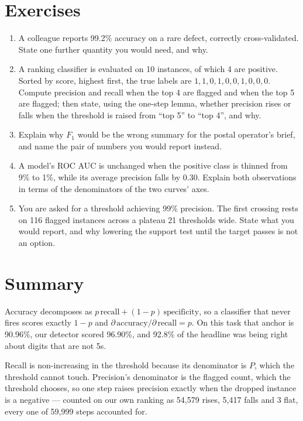 \documentclass[11pt,a4paper]{article}
\begin{document}
\section{Exercises}

\begin{enumerate}[leftmargin=1.6em,itemsep=4pt]
  \item A colleague reports 99.2\% accuracy on a rare defect, correctly
        cross-validated. State one further quantity you would need, and why.
        \hfill \scope{[4]}
  \item A ranking classifier is evaluated on 10 instances, of which 4 are
        positive. Sorted by score, highest first, the true labels are
        $1,1,0,1,0,0,1,0,0,0$. Compute precision and recall when the top 4 are
        flagged and when the top 5 are flagged; then state, using the one-step
        lemma, whether precision rises or falls when the threshold is raised
        from ``top 5'' to ``top 4'', and why. \hfill \scope{[3]}
  \item Explain why $F_1$ would be the wrong summary for the postal operator's
        brief, and name the pair of numbers you would report instead.
        \hfill \scope{[4]}
  \item A model's ROC AUC is unchanged when the positive class is thinned from
        9\% to 1\%, while its average precision falls by 0.30. Explain both
        observations in terms of the denominators of the two curves' axes.
        \hfill \scope{[5]}
  \item You are asked for a threshold achieving 99\% precision. The first
        crossing rests on 116 flagged instances across a plateau 21 thresholds
        wide. State what you would report, and why lowering the support test
        until the target passes is not an option. \hfill \scope{[4]}
\end{enumerate}

\section*{Summary}

Accuracy decomposes as $p\,\text{recall} + (1-p)\,\text{specificity}$, so a
classifier that never fires scores exactly $1-p$ and
$\partial\,\text{accuracy}/\partial\,\text{recall} = p$. On this task that
anchor is 90.96\%, our detector scored 96.90\%, and 92.8\% of the headline was
being right about digits that are not 5s.

Recall is non-increasing in the threshold because its denominator is $P$, which
the threshold cannot touch. Precision's denominator is the flagged count, which
the threshold chooses, so one step raises precision exactly when the dropped
instance is a negative --- counted on our own ranking as 54{,}579 rises,
5{,}417 falls and 3 flat, every one of 59{,}999 steps accounted for.
\end{document}
